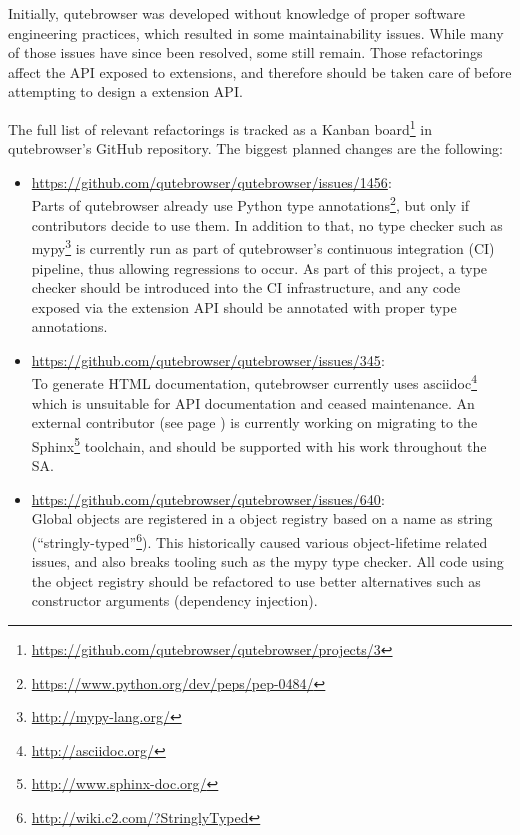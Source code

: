 \documentclass[a4paper,parskip=full]{scrreprt}
\begin{document}
Initially, qutebrowser was developed without knowledge of proper software
engineering practices, which resulted in some maintainability issues. While many
of those issues have since been resolved, some still remain. Those
refactorings affect the API exposed to extensions, and therefore should be taken
care of before attempting to design a extension API.

The full list of relevant refactorings is tracked as a Kanban
board\footnote{\url{https://github.com/qutebrowser/qutebrowser/projects/3}} in
qutebrowser's GitHub repository. The biggest planned changes are the following:

\begin{itemize}
  \item \url{https://github.com/qutebrowser/qutebrowser/issues/1456}: \\ Parts of qutebrowser already use Python type
    annotations\footnote{\url{https://www.python.org/dev/peps/pep-0484/}}, but
    only if contributors decide to use them. In addition to that, no type
    checker such as mypy\footnote{\url{http://mypy-lang.org/}} is currently run
    as part of qutebrowser's continuous integration (CI) pipeline, thus allowing
    regressions to occur. As part of this project, a type checker should be
    introduced into the CI infrastructure, and any code exposed via the extension
    API should be annotated with proper type annotations.
  \item \url{https://github.com/qutebrowser/qutebrowser/issues/345}: \\
    To generate HTML documentation, qutebrowser currently uses
    asciidoc\footnote{\url{http://asciidoc.org/}} which is unsuitable for API
    documentation and ceased maintenance. An external contributor (see page
    \pageref{fiete}) is currently working on migrating to the
    Sphinx\footnote{\url{http://www.sphinx-doc.org/}} toolchain, and should be
    supported with his work throughout the SA.
  \item \url{https://github.com/qutebrowser/qutebrowser/issues/640}: \\
    Global objects are registered in a object registry based on a name as
    string (``stringly-typed''\footnote{\url{http://wiki.c2.com/?StringlyTyped}}).
    This historically caused various object-lifetime related issues, and also
breaks tooling such as the mypy type checker. All code using the object registry
should be refactored to use better alternatives such as constructor arguments
(dependency injection).
\end{itemize}
\end{document}
